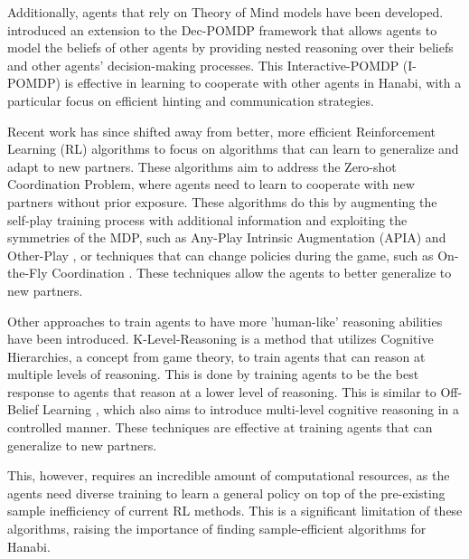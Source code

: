 Additionally, agents that rely on Theory of Mind models have been developed. \textcite{fuchsTheoryMindDeep2021} introduced an extension to the Dec-POMDP framework that allows agents to model the beliefs of other agents by providing nested reasoning over their beliefs and other agents' decision-making processes. This Interactive-POMDP (I-POMDP) is effective in learning to cooperate with other agents in Hanabi, with a particular focus on efficient hinting and communication strategies.

Recent work has since shifted away from better, more efficient Reinforcement Learning (RL) algorithms to focus on algorithms that can learn to generalize and adapt to new partners\cite{huOffBeliefLearning2021, huOtherPlayZeroShotCoordination,lucasAnyPlayIntrinsicAugmentation2022,siuEvaluationHumanAITeams2021,zandOntheflyStrategyAdaptation2022}. These algorithms aim to address the Zero-shot Coordination Problem, where agents need to learn to cooperate with new partners without prior exposure. These algorithms do this by augmenting the self-play training process with additional information and exploiting the symmetries of the MDP, such as Any-Play Intrinsic Augmentation (APIA) \cite{lucasAnyPlayIntrinsicAugmentation2022} and Other-Play \cite{huOtherPlayZeroShotCoordination}, or techniques that can change policies during the game, such as On-the-Fly Coordination \cite{zandOntheflyStrategyAdaptation2022}. These techniques allow the agents to better generalize to new partners.

Other approaches to train agents to have more 'human-like' reasoning abilities have been introduced. K-Level-Reasoning \cite{cuiKlevelReasoningZeroShot2021} is a method that utilizes Cognitive Hierarchies, a concept from game theory, to train agents that can reason at multiple levels of reasoning. This is done by training agents to be the best response to agents that reason at a lower level of reasoning. This is similar to Off-Belief Learning \cite{huOffBeliefLearning2021}, which also aims to introduce multi-level cognitive reasoning in a controlled manner. These techniques are effective at training agents that can generalize to new partners.

This, however, requires an incredible amount of computational resources, as the agents need diverse training to learn a general policy on top of the pre-existing sample inefficiency of current RL methods. This is a significant limitation of these algorithms, raising the importance of finding sample-efficient algorithms for Hanabi.